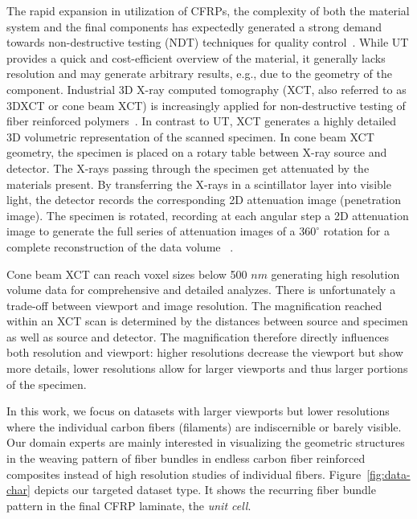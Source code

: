 {The rapid expansion in utilization of CFRPs, the complexity of both the material system and the final components has expectedly generated a strong demand towards non-destructive testing (NDT) techniques for quality control~\cite{Red2012}.}  While UT provides a quick and cost-efficient overview of the material, it generally lacks resolution and may generate arbitrary results, e.g., due to the geometry of the component. Industrial 3D X-ray computed tomography (XCT, also referred to as 3DXCT or cone beam XCT) is increasingly applied for non-destructive testing of fiber reinforced polymers~\cite{Kastner2012}. In contrast to UT, XCT generates a highly detailed 3D volumetric representation of the scanned specimen. In cone beam XCT geometry, the specimen is placed on a rotary table between X-ray source and detector. The X-rays passing through the specimen get attenuated by the materials present. By transferring the X-rays in a scintillator layer into visible light, the detector records the corresponding 2D attenuation image (penetration image). The specimen is rotated, recording at each angular step a 2D attenuation image to generate the full series of attenuation images of a $360^\circ$ rotation for a complete reconstruction of the data volume ~\cite{heinzl-2008-thesis}. 

Cone beam XCT can reach voxel sizes below 500 $nm$ generating high resolution volume data for comprehensive and detailed analyzes. There is unfortunately a trade-off between viewport and image resolution. The magnification reached within an XCT scan is determined by the distances between source and specimen as well as source and detector. The magnification therefore directly influences both resolution and viewport: higher resolutions decrease the viewport but show more details, lower resolutions allow for larger viewports and thus larger portions of the specimen.

In this work, we focus on datasets with larger viewports but
lower resolutions where the individual carbon fibers (filaments) are indiscernible or barely visible. Our domain experts are mainly interested in visualizing the geometric structures in the weaving pattern of fiber bundles in endless carbon fiber reinforced composites instead of high resolution studies of individual fibers.
Figure~\ref{fig:data-char} depicts our targeted dataset type. It shows the recurring fiber bundle pattern in the final CFRP laminate, the \textit{unit cell}.


